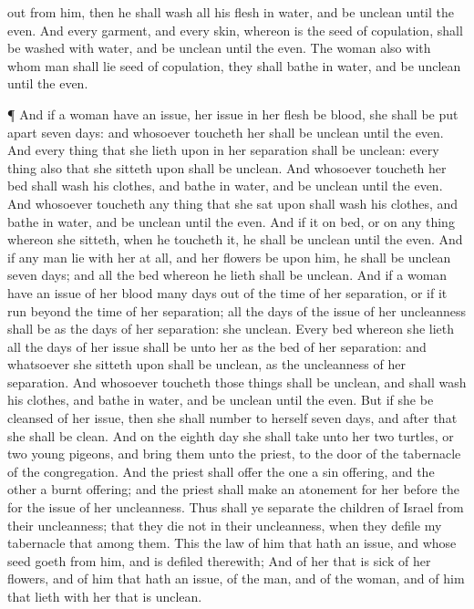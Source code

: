 {out from him, then he shall
wash all his
flesh in
water, and be
unclean until the
even.
And every
garment, and every
skin, whereon is the
seed of
copulation, shall be
washed with
water, and be
unclean until the
even.
The
woman also with whom
man shall
lie
{}
seed of
copulation, they shall
{}
bathe
{} in
water, and be
unclean until the
even.
\par }{\PP {}¶ And if a
woman have an
issue,
{} her
issue in her
flesh be
blood, she shall be put
apart
seven
days: and whosoever
toucheth her shall be
unclean until the
even.
And every thing that she
lieth upon in her
separation shall be
unclean: every thing also that she
sitteth upon shall be
unclean.
And whosoever
toucheth her
bed shall
wash his
clothes, and
bathe
{} in
water, and be
unclean until the
even.
And whosoever
toucheth any
thing that she
sat upon shall
wash his
clothes, and
bathe
{} in
water, and be
unclean until the
even.
And if it
{} on
{}
bed, or on any
thing whereon she
sitteth, when he
toucheth it, he shall be
unclean until the
even.
And if any
man
lie with her at
all, and her
flowers be upon him, he shall be
unclean
seven
days; and all the
bed whereon he
lieth shall be
unclean.
And if a
woman
have an
issue of her
blood
many
days
out of the
time of her
separation, or if it
run beyond the
time of her
separation; all the
days of the
issue of her
uncleanness shall be as the
days of her
separation: she
{}
unclean.
Every
bed whereon she
lieth all the
days of her
issue shall be unto her as the
bed of her
separation: and
whatsoever she
sitteth upon shall be
unclean, as the
uncleanness of her
separation.
And whosoever
toucheth those things shall be
unclean, and shall
wash his
clothes, and
bathe
{} in
water, and be
unclean until the
even.
But if she be
cleansed of her
issue, then she shall
number to herself
seven
days, and
after that she shall be
clean.
And on the
eighth
day she shall
take unto her
two
turtles, or
two
young
pigeons, and
bring them unto the
priest, to the
door of the
tabernacle of the
congregation.
And the
priest shall
offer the
one
{} a sin
offering, and the
other
{} a burnt
offering; and the
priest shall make an
atonement for her
before the
{} for the
issue of her
uncleanness.
Thus shall ye
separate the
children of
Israel from their
uncleanness; that they
die not in their
uncleanness, when they
defile my
tabernacle that
{}
among them.
This
{} the
law of him that hath an
issue, and
{} whose
seed
goeth from him, and is
defiled therewith;
And of her that is
sick of her
flowers, and of him that
hath an
issue, of the
man, and of the
woman, and of
him that
lieth with her that is
unclean.

}
